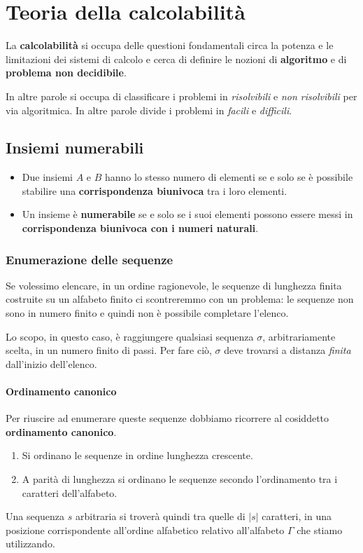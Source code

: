 \chapter{Teoria della calcolabilit\`a}\label{calcolabilita}
La \textbf{calcolabilit\`a} si occupa delle questioni fondamentali circa la potenza e le limitazioni dei sistemi di
calcolo e cerca di definire le nozioni di \textbf{algoritmo} e di \textbf{problema non decidibile}.

In altre parole si occupa di classificare i problemi in \emph{risolvibili} e \emph{non risolvibili} per via algoritmica.
In altre parole divide i problemi in \emph{facili} e \emph{difficili}.


\section{Insiemi numerabili}\label{insiemi_numerabili}
\begin{itemize}
	\item Due insiemi $A$ e $B$ hanno lo stesso numero di elementi se e solo se \`e possibile stabilire una
	      \textbf{corrispondenza biunivoca} tra i loro elementi.
	\item Un insieme \`e \textbf{numerabile} se e solo se i suoi elementi possono essere messi in
	      \textbf{corrispondenza biunivoca con i numeri naturali}.
\end{itemize}

\subsection{Enumerazione delle sequenze}
Se volessimo elencare, in un ordine ragionevole, le sequenze di lunghezza finita costruite su un alfabeto finito ci
scontreremmo con un problema: le sequenze non sono in numero finito e quindi non \`e possibile completare l'elenco.

Lo scopo, in questo caso, \`e raggiungere qualsiasi sequenza $\sigma$, arbitrariamente scelta, in un numero finito di
passi. Per fare ci\`o, $\sigma$ deve trovarsi a distanza \emph{finita} dall'inizio dell'elenco.

\subsubsection{Ordinamento canonico}
Per riuscire ad enumerare queste sequenze dobbiamo ricorrere al cosiddetto \textbf{ordinamento canonico}.
\begin{enumerate}
	\item Si ordinano le sequenze in ordine lunghezza crescente.
	\item A parit\`a di lunghezza si ordinano le sequenze secondo l'ordinamento tra i caratteri dell'alfabeto.
\end{enumerate}
Una sequenza $s$ arbitraria si trover\`a quindi tra quelle di $| s |$ caratteri, in una posizione corrispondente
all'ordine alfabetico relativo all'alfabeto $\Gamma$ che stiamo utilizzando.

